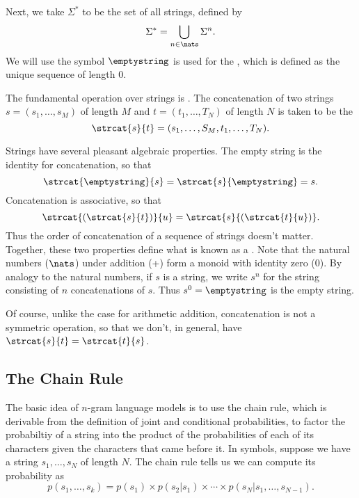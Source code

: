 Next, we take $\Sigma^*$ to be the set of all strings, defined by
%
\begin{equation}
\Sigma^* = \bigcup_{n  \in \nats} \Sigma^n.
\end{equation}
%
We will use the symbol $\emptystring$ is used for the , which is defined as the unique sequence of length 0.

The fundamental operation over strings is .
The concatenation of two strings $s = (s_1,\ldots,s_M)$ of length
$M$ and $t = (t_1,\ldots,T_N)$ of length $N$ is taken to be the
%
\begin{equation}
\strcat{s}{t} = (s_1,\ldots,S_M,t_1,\ldots,T_N).
\end{equation}

Strings have several pleasant algebraic properties.   The
empty string is the identity for concatenation, so that
%
\begin{equation}
\strcat{\emptystring}{s} = \strcat{s}{\emptystring} = s.
\end{equation}
%
Concatenation is associative, so that
%
\begin{equation}
\strcat{(\strcat{s}{t})}{u} = \strcat{s}{(\strcat{t}{u})}.
\end{equation}
%
Thus the order of concatenation of a sequence of strings doesn't
matter.  Together, these two properties define what is known as a
.  Note that the natural numbers ($\nats$) under
addition (+) form a monoid with identity zero (0).  By analogy to the
natural numbers, if $s$ is a string, we write $s^n$ for the string
consisting of $n$ concatenations of $s$.  Thus $s^0 = \emptystring$
is the empty string.

Of course, unlike the case for arithmetic addition, concatenation is
not a symmetric operation, so that we don't, in general, have
$\strcat{s}{t} = \strcat{t}{s}$. 




\subsection{The Chain Rule}

The basic idea of $n$-gram language models is to use the chain rule,
which is derivable from the definition of joint and conditional
probabilities, to factor the probabiltiy of a string into the product
of the probabilities of each of its characters given the characters
that came before it.  In symbols, suppose we have a string
$s_1,\ldots,s_N$ of length $N$.  The chain rule tells us we can
compute its probability as
%
\begin{equation}
p(s_1,\ldots,s_k) = p(s_1) \times p(s_2|s_1) \times \cdots \times p(s_N|s_1,\ldots,s_{N-1}).\label{eq:char-lm-chain-rule}
\end{equation}
%

